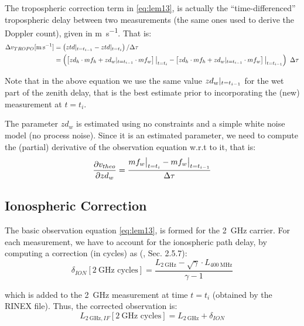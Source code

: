 The tropospheric correction term in \ref{eq:lem13}, is actually the ``time-differenced'' 
tropospheric delay between two measurements (the same ones used to derive the 
Doppler count), given in \si{\m \per \s}. That is:
\begin{equation}
  \begin{aligned}
    \Delta v_{TROPO} [\si{\m \per \s}] &= \left( ztd\at{t=t_{i-1}} - ztd\at{t=t_{i}} \right) / \Delta \tau\\
     &= \left( \left[ zd_{h} \cdot mf_{h} + zd_{w}\at{t=t_{i-1}} \cdot mf_{w} \right]\at[\big]{t=t_i} - 
        \left[ zd_{h} \cdot mf_{h} + zd_{w}\at{t=t_{i-1}} \cdot mf_{w} \right]\at[\big]{t=t_{i-1}} \right) \ \Delta \tau
  \end{aligned}
\end{equation}

Note that in the above equation we use the same value $zd_{w}\at{t=t_{i-1}}$ 
for the wet part of the zenith delay, that is the best estimate prior to 
incorporating the (new) measurement at $t=t_i$.

The parameter $zd_{w}$ is estimated using no constraints and a simple white 
noise model (no process noise). Since it is an estimated parameter, we need 
to compute the (partial) derivative of the observation equation w.r.t to it, 
that is:
\begin{equation}
  \frac{\partial v_{theo}}{\partial zd_{w}} = \frac{mf_{w}\at[\big]{t=t_i} 
    - mf_{w}\at[\big]{t=t_{i-1}}}{\Delta \tau}
\end{equation}

\subsection{Ionospheric Correction}
\label{ssec:iono-correction}
The basic observation equation \ref{eq:lem13}, is formed for the \SI{2}{\GHz} 
carrier. For each measurement, we have to account for the ionospheric path 
delay, by computing a correction (in cycles) as (\cite{lemoine-2016}, Sec. 2.5.7):
\begin{equation}
  \delta_{ION} [\SI{2}{\GHz}\text{ cycles}] = 
    \frac{L_{\SI{2}{\GHz}} - \sqrt{\gamma} \cdot L_{\SI{400}{\MHz}}}{\gamma - 1}
  \label{eq:iono-delay-cycles}
\end{equation}

which is added to the \SI{2}{\GHz} measurement at time $t=t_i$ (obtained by the 
RINEX file). Thus, the corrected observation is:
\begin{equation}
  L_{\SI{2}{\GHz},IF} [\SI{2}{\GHz}\text{ cycles}] = 
    L_{\SI{2}{\GHz}} + \delta_{ION}
  \label{eq:l2if}
\end{equation}

